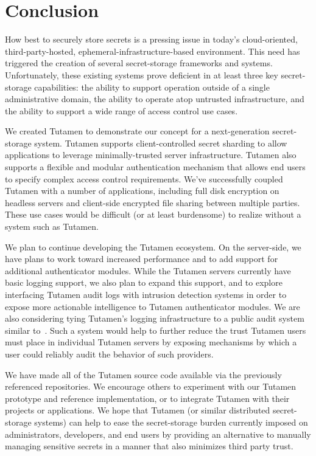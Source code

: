 \section{Conclusion}
\label{sec:conclusion}

How best to securely store secrets is a pressing issue in today's
cloud-oriented, third-party-hosted, ephemeral-infrastructure-based
environment. This need has triggered the creation of several
secret-storage frameworks and systems. Unfortunately, these existing
systems prove deficient in at least three key secret-storage
capabilities: the ability to support operation outside of a single
administrative domain, the ability to operate atop untrusted
infrastructure, and the ability to support a wide range of access
control use cases.

We created Tutamen to demonstrate our concept for a next-generation
secret-storage system. Tutamen supports client-controlled secret
sharding to allow applications to leverage minimally-trusted server
infrastructure. Tutamen also supports a flexible and modular
authentication mechanism that allows end users to specify complex
access control requirements. We've successfully coupled Tutamen with a
number of applications, including full disk encryption on headless
servers and client-side encrypted file sharing between multiple
parties. These use cases would be difficult (or at least burdensome)
to realize without a system such as Tutamen.

We plan to continue developing the Tutamen ecosystem. On the
server-side, we have plans to work toward increased performance and to
add support for additional authenticator modules. While the Tutamen
servers currently have basic logging support, we also plan to expand
this support, and to explore interfacing Tutamen audit logs with
intrusion detection systems in order to expose more actionable
intelligence to Tutamen authenticator modules. We are also considering
tying Tutamen's logging infrastructure to a public audit system
similar to~\cite{laurie2013}. Such a system would help to further
reduce the trust Tutamen users must place in individual Tutamen
servers by exposing mechanisms by which a user could reliably audit
the behavior of such providers.

We have made all of the Tutamen source code available via the
previously referenced repositories. We encourage others to experiment
with our Tutamen prototype and reference implementation, or to
integrate Tutamen with their projects or applications. We hope that
Tutamen (or similar distributed secret-storage systems) can help to
ease the secret-storage burden currently imposed on administrators,
developers, and end users by providing an alternative to manually
managing sensitive secrets in a manner that also minimizes third party
trust.

